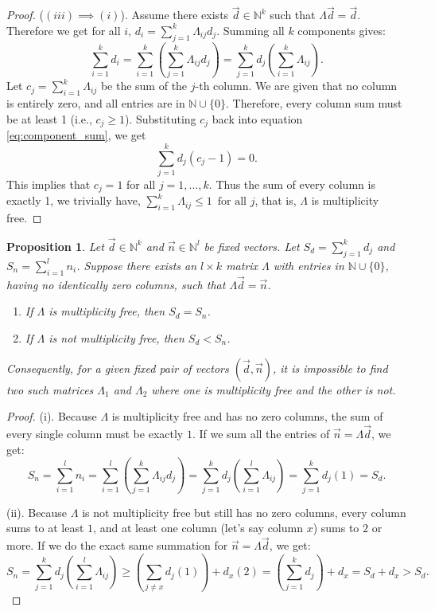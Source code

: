 \documentclass[12pt,a4paper]{amsart}
\theoremstyle{plain}
\newtheorem{prop}[theorem]{Proposition}
\theoremstyle{definition}
\theoremstyle{remark}
\numberwithin{equation}{section}
\theoremstyle{ser}
\theoremstyle{serr}
\theoremstyle{ser}
\theoremstyle{ser}
\theoremstyle{collabquestion}
\newcommand{\N}{\mathbb{N}}
\newcommand{\<}{\langle}
\renewcommand{\>}{\rangle}
\begin{document}
\begin{proof}
    \noindent ($(iii) \implies (i)$). Assume there exists $\vec{d} \in \mathbb{N}^k$ such that $\Lambda \vec{d} = \vec{d}$. Therefore we get for all $i,\, d_i = \sum_{j=1}^k \Lambda_{ij} d_j$.
    Summing all $k$ components gives:
    \begin{equation}\label{eq:component_sum}
     \sum_{i=1}^k d_i = \sum_{i=1}^k \left( \sum_{j=1}^k \Lambda_{ij} d_j \right)=\sum_{j=1}^k d_j \left( \sum_{i=1}^k \Lambda_{ij} \right).   
    \end{equation}
    Let $c_j = \sum_{i=1}^k \Lambda_{ij}$ be the sum of the $j$-th column. We are given that no column is entirely zero, and all entries are in $\mathbb{N} \cup \{0\}$. Therefore, every column sum must be at least 1 (i.e., $c_j \ge 1$). Substituting $c_j$ back into equation \ref{eq:component_sum}, we get
    $$\sum_{j=1}^k d_j (c_j - 1) = 0.$$
    This implies that $c_j = 1$ for all $j = 1, \dots, k$. Thus the sum of every column is exactly 1, we trivially have, $\sum_{i=1}^k \Lambda_{ij} \leq 1 \,\,\, \text{for all } j$, that is, $\Lambda$ is multiplicity free.
\end{proof}

\begin{prop}\label{prop:mul_embed}
    Let $\vec{d} \in \N^k$ and $\vec{n} \in \mathbb{N}^l$ be fixed vectors. Let $S_d = \sum_{j=1}^k d_j$ and $S_n = \sum_{i=1}^l n_i$. Suppose there exists an $l \times k$ matrix $\Lambda$ with entries in $\mathbb{N} \cup \{0\}$, having no identically zero columns, such that $\Lambda \vec{d} = \vec{n}$.
    \begin{enumerate}
    \item[(i)] If $\Lambda$ is multiplicity free, then $S_d = S_n$.
    \item[(ii)] If $\Lambda$ is not multiplicity free, then $S_d < S_n$.
\end{enumerate}
Consequently, for a given fixed pair of vectors $(\vec{d}, \vec{n})$, it is impossible to find two such matrices $\Lambda_1$ and $\Lambda_2$ where one is multiplicity free and the other is not.
\end{prop}
\begin{proof}
    \noindent (i). Because $\Lambda$ is multiplicity free and has no zero columns, the sum of every single column must be exactly $1$. If we sum all the entries of $\vec{n} = \Lambda \vec{d}$, we get:
    $$S_n = \sum_{i=1}^l n_i = \sum_{i=1}^l \left( \sum_{j=1}^k \Lambda_{ij} d_j \right) = \sum_{j=1}^k d_j \left( \sum_{i=1}^l \Lambda_{ij} \right)= \sum_{j=1}^k d_j (1) = S_d.$$

    \noindent (ii). Because $\Lambda$ is not multiplicity free but still has no zero columns, every column sums to at least $1$, and at least one column (let's say column $x$) sums to $2$ or more. If we do the exact same summation for $\vec{n} = \Lambda \vec{d}$, we get:
    $$S_n = \sum_{j=1}^k d_j \left( \sum_{i=1}^l \Lambda_{ij} \right) \ge \left( \sum_{j \neq x} d_j (1) \right) + d_x (2) = \left( \sum_{j=1}^k d_j \right) + d_x = S_d + d_x>S_d.$$
\end{proof}
\end{document}
